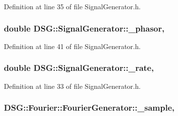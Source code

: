 Definition at line 35 of file Signal\-Generator.\-h.

\hypertarget{classDSG_1_1SignalGenerator_ac2271b582bf699275f077ecb642a8cd9}{
\subsubsection[{\-\_\-phasor}]{\setlength{\rightskip}{0pt plus 5cm}double D\-S\-G\-::\-Signal\-Generator\-::\-\_\-phasor\hspace{0.3cm}{\ttfamily [protected]}, {\ttfamily [inherited]}}}\label{classDSG_1_1SignalGenerator_ac2271b582bf699275f077ecb642a8cd9}


Definition at line 41 of file Signal\-Generator.\-h.

\hypertarget{classDSG_1_1SignalGenerator_aa10f6c85d9adee901139ea7fb346f39d}{
\subsubsection[{\-\_\-rate}]{\setlength{\rightskip}{0pt plus 5cm}double D\-S\-G\-::\-Signal\-Generator\-::\-\_\-rate\hspace{0.3cm}{\ttfamily [protected]}, {\ttfamily [inherited]}}}\label{classDSG_1_1SignalGenerator_aa10f6c85d9adee901139ea7fb346f39d}


Definition at line 33 of file Signal\-Generator.\-h.

\hypertarget{classDSG_1_1Fourier_1_1FourierGenerator_aaf63683d2173cd41ff1d65b4c454e87a}{
\subsubsection[{\-\_\-sample}]{ D\-S\-G\-::\-Fourier\-::\-Fourier\-Generator\-::\-\_\-sample\hspace{0.3cm}{\ttfamily [protected]}, {\ttfamily [inherited]}}}\label{classDSG_1_1Fourier_1_1FourierGenerator_aaf63683d2173cd41ff1d65b4c454e87a}


